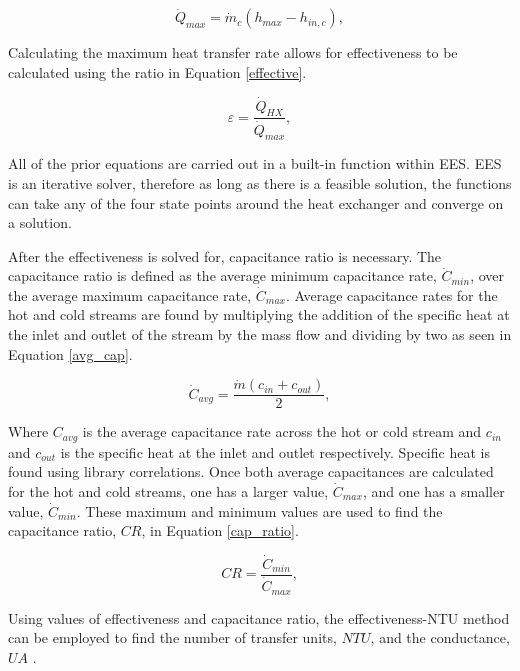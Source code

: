 \begin{paracol}{2}
\begin{equation}
    \label{heattrans_max}
    \dot{Q}_{max} = \dot{m}_{c}(h_{max}-h_{in,c}),
\end{equation}

Calculating the maximum heat transfer rate allows for effectiveness to be calculated using the ratio in Equation \ref{effective}.

\begin{equation}
    \label{effective}
    \varepsilon = \frac{\dot{Q}_{HX}}{\dot{Q}_{max}},
\end{equation}

All of the prior equations are carried out in a built-in function within EES. EES is an iterative solver, therefore as long as there is a feasible solution, the functions can take any of the four state points around the heat exchanger and converge on a solution.

After the effectiveness is solved for, capacitance ratio is necessary. The capacitance ratio is defined as the average minimum capacitance rate, $\dot{C}_{min}$, over the average maximum capacitance rate, $\dot{C}_{max}$. Average capacitance rates for the hot and cold streams are found by multiplying the addition of the specific heat at the inlet and outlet of the stream by the mass flow and dividing by two as seen in Equation \ref{avg_cap}.

\begin{equation}
    \label{avg_cap}
    \dot{C}_{avg} = \frac{\dot{m}(c_{in}+c_{out})}{2},
\end{equation}

Where $C_{avg}$ is the average capacitance rate across the hot or cold stream and $c_{in}$ and $c_{out}$ is the specific heat at the inlet and outlet respectively. Specific heat is found using library correlations. Once both average capacitances are calculated for the hot and cold streams, one has a larger value, $\dot{C}_{max}$, and one has a smaller value,  $\dot{C}_{min}$. These maximum and minimum values are used to find the capacitance ratio, $CR$, in Equation \ref{cap_ratio}.

\begin{equation}
    \label{cap_ratio}
    CR = \frac{\dot{C}_{min}}{\dot{C}_{max}},
\end{equation}

Using values of effectiveness and capacitance ratio, the effectiveness-NTU method can be employed to find the number of transfer units, $NTU$, and the conductance, $UA$ \cite{klein_nellis_2011,nellis_klein_2008}. 




\end{paracol}
